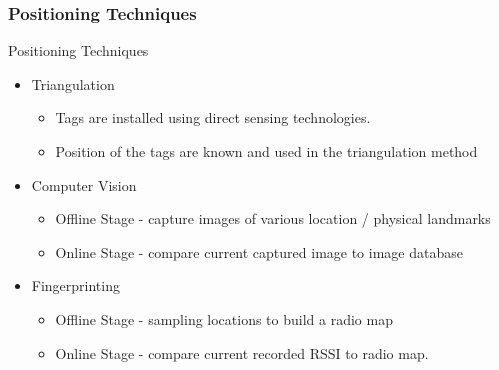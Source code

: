 \subsubsection{Positioning Techniques} \label{sssec:litRev_inLocal_posTech}
\begin{frame}{Positioning Techniques}

	\begin{itemize}[<+-| alert@+>]
    \item Triangulation    
        \begin{itemize}
          \item Tags are installed using direct sensing technologies.
          \item Position of the tags are known and used in the triangulation method
        \end{itemize}
        
    \item Computer Vision    
        \begin{itemize}
            \item Offline Stage - capture images of various location / physical landmarks
            \item Online Stage - compare current captured image to image database
        \end{itemize}

    \item Fingerprinting   
        \begin{itemize}
            \item Offline Stage - sampling locations to build a radio map
            \item Online Stage - compare current recorded RSSI to radio map.
        \end{itemize}

  	\end{itemize}

\end{frame}

